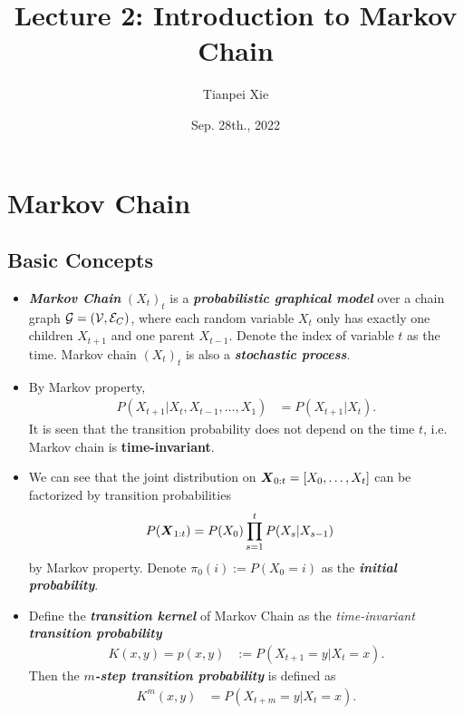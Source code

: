 \documentclass[11pt]{article}
\begin{document}
\title{Lecture 2: Introduction to Markov Chain}
\author{ Tianpei Xie}
\date{Sep. 28th., 2022 }
\maketitle
\tableofcontents
\newpage
\allowdisplaybreaks
\section{Markov Chain}
\subsection{Basic Concepts}
\begin{itemize}
\item \emph{\textbf{Markov Chain}} $(X_t)_t$ is a \emph{\textbf{probabilistic graphical model}} over a chain graph ${\mathcal G}=({\mathcal V}, {\mathcal E}_{C})$, where each random variable $X_t$ only has exactly one children $X_{t+1}$ and one parent $X_{t-1}$. Denote the index of variable $t$ as the time. Markov chain  $(X_t)_t$ is also a \emph{\textbf{stochastic process}}. 

\item By Markov property, 
\begin{align*}
P(X_{t+1} | X_t, X_{t-1}, \ldots, X_1) &= P(X_{t+1} | X_t) .
\end{align*} It is seen that the transition probability does not depend on the time $t$, i.e. Markov chain is \textbf{time-invariant}.

\item We can see that the joint distribution on $\boldsymbol{X}_{0:t} = [X_0, \ldots, X_t]$ can be factorized by transition probabilities
\begin{align*}
P(\boldsymbol{X}_{1:t} ) &= P(X_0)\prod_{s=1}^{t}P(X_s| X_{s-1})
\end{align*} by Markov property. Denote $\pi_{0}(i) := P(X_0 = i)$ as the \emph{\textbf{initial probability}}.


\item Define the \emph{\textbf{transition kernel}} of Markov Chain as the \emph{time-invariant} \emph{\textbf{transition probability}}
\begin{align}
K(x, y)  = p(x, y) &:= P(X_{t+1} = y | X_t = x).  \label{eqn: mc_kernel}
\end{align} Then the \emph{\textbf{$m$-step transition probability}} is defined as
\begin{align}
K^{m}(x, y) &= P(X_{t+m} = y | X_t = x). \label{eqn: mc_kernel_m}
\end{align}


\end{itemize}
\end{document}
